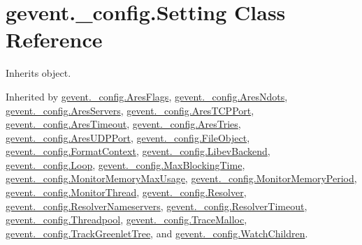 \hypertarget{classgevent_1_1__config_1_1_setting}{}\section{gevent.\+\_\+config.\+Setting Class Reference}
\label{classgevent_1_1__config_1_1_setting}


Inherits object.



Inherited by \hyperlink{classgevent_1_1__config_1_1_ares_flags}{gevent.\+\_\+config.\+Ares\+Flags}, \hyperlink{classgevent_1_1__config_1_1_ares_ndots}{gevent.\+\_\+config.\+Ares\+Ndots}, \hyperlink{classgevent_1_1__config_1_1_ares_servers}{gevent.\+\_\+config.\+Ares\+Servers}, \hyperlink{classgevent_1_1__config_1_1_ares_t_c_p_port}{gevent.\+\_\+config.\+Ares\+T\+C\+P\+Port}, \hyperlink{classgevent_1_1__config_1_1_ares_timeout}{gevent.\+\_\+config.\+Ares\+Timeout}, \hyperlink{classgevent_1_1__config_1_1_ares_tries}{gevent.\+\_\+config.\+Ares\+Tries}, \hyperlink{classgevent_1_1__config_1_1_ares_u_d_p_port}{gevent.\+\_\+config.\+Ares\+U\+D\+P\+Port}, \hyperlink{classgevent_1_1__config_1_1_file_object}{gevent.\+\_\+config.\+File\+Object}, \hyperlink{classgevent_1_1__config_1_1_format_context}{gevent.\+\_\+config.\+Format\+Context}, \hyperlink{classgevent_1_1__config_1_1_libev_backend}{gevent.\+\_\+config.\+Libev\+Backend}, \hyperlink{classgevent_1_1__config_1_1_loop}{gevent.\+\_\+config.\+Loop}, \hyperlink{classgevent_1_1__config_1_1_max_blocking_time}{gevent.\+\_\+config.\+Max\+Blocking\+Time}, \hyperlink{classgevent_1_1__config_1_1_monitor_memory_max_usage}{gevent.\+\_\+config.\+Monitor\+Memory\+Max\+Usage}, \hyperlink{classgevent_1_1__config_1_1_monitor_memory_period}{gevent.\+\_\+config.\+Monitor\+Memory\+Period}, \hyperlink{classgevent_1_1__config_1_1_monitor_thread}{gevent.\+\_\+config.\+Monitor\+Thread}, \hyperlink{classgevent_1_1__config_1_1_resolver}{gevent.\+\_\+config.\+Resolver}, \hyperlink{classgevent_1_1__config_1_1_resolver_nameservers}{gevent.\+\_\+config.\+Resolver\+Nameservers}, \hyperlink{classgevent_1_1__config_1_1_resolver_timeout}{gevent.\+\_\+config.\+Resolver\+Timeout}, \hyperlink{classgevent_1_1__config_1_1_threadpool}{gevent.\+\_\+config.\+Threadpool}, \hyperlink{classgevent_1_1__config_1_1_trace_malloc}{gevent.\+\_\+config.\+Trace\+Malloc}, \hyperlink{classgevent_1_1__config_1_1_track_greenlet_tree}{gevent.\+\_\+config.\+Track\+Greenlet\+Tree}, and \hyperlink{classgevent_1_1__config_1_1_watch_children}{gevent.\+\_\+config.\+Watch\+Children}.

